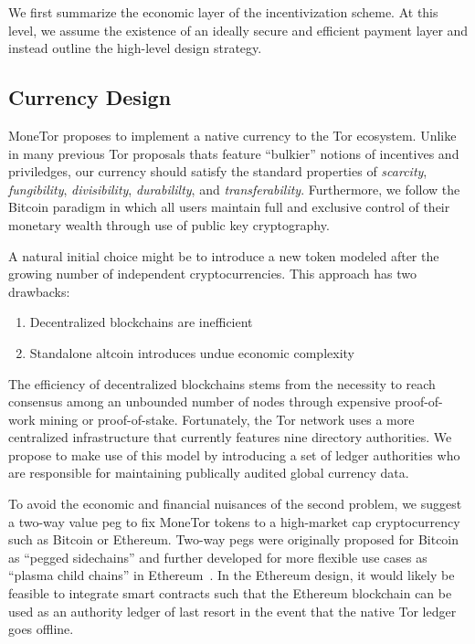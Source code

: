 We first summarize the economic layer of the incentivization scheme. At this
level, we assume the existence of an ideally secure and efficient payment layer
and instead outline the high-level design strategy.

\subsection{Currency Design}

MoneTor proposes to implement a native currency to the Tor ecosystem. Unlike in
many previous Tor proposals thats feature ``bulkier'' notions of incentives and
priviledges, our currency should satisfy the standard properties of
\textit{scarcity}, \textit{fungibility}, \textit{divisibility},
\textit{durabililty}, and \textit{transferability}.  Furthermore, we
follow the Bitcoin paradigm in which all users maintain full and exclusive
control of their monetary wealth through use of public key cryptography.

A natural initial choice might be to introduce a new token modeled after the
growing number of independent cryptocurrencies. This approach has two drawbacks:

\begin{enumerate}
\item Decentralized blockchains are inefficient
\item Standalone altcoin introduces undue economic complexity
\end{enumerate}

The efficiency of decentralized blockchains stems from the necessity to reach
consensus among an unbounded number of nodes through expensive proof-of-work
mining or proof-of-stake. Fortunately, the Tor network uses a more centralized
infrastructure that currently features nine directory authorities. We propose to
make use of this model by introducing a set of ledger authorities who are
responsible for maintaining publically audited global currency data.

To avoid the economic and financial nuisances of the second problem, we suggest
a two-way value peg to fix MoneTor tokens to a high-market cap cryptocurrency
such as Bitcoin or Ethereum. Two-way pegs were originally proposed for Bitcoin
as ``pegged sidechains'' and further developed for more flexible use cases as
``plasma child chains'' in Ethereum~\cite{back2014enabling, poon2017plasma}. In
the Ethereum design, it would likely be feasible to integrate smart contracts
such that the Ethereum blockchain can be used as an authority ledger of last
resort in the event that the native Tor ledger goes offline.

